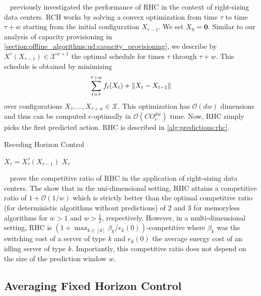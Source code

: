 \citeauthor*{Lin2012}~\cite{Lin2012} previously investigated the performance of RHC in the context of right-sizing data centers. RCH works by solving a convex optimization from time $\tau$ to time $\tau + w$ starting from the initial configuration $X_{\tau-1}$. We set $X_0 = \mathbf{0}$. Similar to our analysis of capacity provisioning in \cref{section:offline_algorithms:ud:capacity_provisioning}, we describe by $X^{\tau}(X_{\tau-1}) \in \mathcal{X}^{w+1}$ the optimal schedule for times $\tau$ through $\tau+w$. This schedule is obtained by minimizing \begin{align}\label{eq:rhc}
    \sum_{t=\tau}^{\tau+w} f_t(X_t) + \lVert X_t - X_{t-1}\rVert
\end{align} over configurations $X_{\tau}, \dots, X_{\tau+w} \in \mathcal{X}$. This optimization has $\mathcal{O}(d w)$ dimensions and thus can be computed $\epsilon$-optimally in $\mathcal{O}(C O_{\epsilon}^{dw})$ time. Now, RHC simply picks the first predicted action. RHC is described in \cref{alg:predictions:rhc}.

\begin{algorithm}
    \caption{Receding Horizon Control~\cite{Lin2012}}\label{alg:predictions:rhc}
    $X_{\tau} = X_{\tau}^{\tau}(X_{\tau-1})$\;
    \Return $X_{\tau}$\;
\end{algorithm}

\citeauthor*{Lin2012}~\cite{Lin2012} prove the competitive ratio of RHC in the application of right-sizing data centers. The show that in the uni-dimensional setting, RHC attains a competitive ratio of $1 + \mathcal{O}(1/w)$ which is strictly better than the optimal competitive ratio (for deterministic algorithms without predictions) of $2$ and $3$ for memoryless algorithms for $w > 1$ and $w > \frac{1}{2}$, respectively. However, in a multi-dimensional setting, RHC is $(1 + \max_{k \in [d]} \beta_k / e_k(0))$-competitive where $\beta_k$ was the switching cost of a server of type $k$ and $e_k(0)$ the average energy cost of an idling server of type $k$. Importantly, this competitive ratio does not depend on the size of the prediction window $w$.

\subsection{Averaging Fixed Horizon Control}

